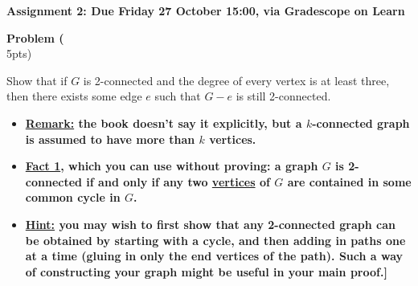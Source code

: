 \documentclass{article}
\newenvironment{problem}[2][Problem]
    { \begin{mdframed}[backgroundcolor=gray!20] \textbf{#1 #2} \\}
    {  \end{mdframed}}
\theoremstyle{definition}
\theoremstyle{definition}
\theoremstyle{remark}
\begin{document}
\begin{centering}\textbf{Assignment 2: Due Friday 27 October 15:00, via Gradescope on Learn}\end{centering}

\begin{problem}{1} (5pts)

Show that if $G$ is 2-connected and the degree of every vertex is at least three, then there exists some edge $e$ such that $G - e$ is still 2-connected.

\begin{itemize}
\item \textbf{\underline{Remark:} the book doesn't say it explicitly, but a $k$-connected graph is assumed to have more than $k$ vertices. }

\item \textbf{\underline{Fact 1}, which you can use without proving: a graph $G$ is 2-connected if and only if any two \underline{vertices} of $G$ are contained in some common cycle in $G$.}

\item \textbf{\underline{Hint:} you may wish to first show that any 2-connected graph can be obtained by starting with a cycle, and then adding in paths one at a time (gluing in only the end vertices of the path). Such a way of constructing your graph might be useful in your main proof.]}
\end{itemize}

\end{problem}
\end{document}
